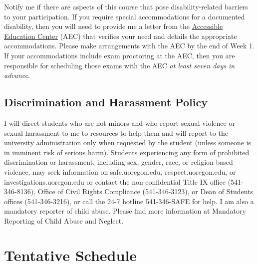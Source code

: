 \documentclass[11pt]{article}
\begin{document}
Notify me if there are aspects of this course that pose disability-related barriers to your participation. If you require special accommodations for a documented disability, then you will need to provide me a letter from the \href{https://aec.uoregon.edu/}{Accessible Education Center} (AEC) that verifies your need and details the appropriate accommodations. Please make arrangements with the AEC by the end of Week 1. If your accommodations include exam proctoring at the AEC, then you are responsible for scheduling those exams with the AEC \textit{at least seven days in advance}.

\subsection*{Discrimination and Harassment Policy} 

I will direct students who are not minors and who report sexual violence or sexual harassment to me to resources to help them and will report to the university administration only when requested by the student (unless someone is in imminent risk of serious harm). Students experiencing any form of prohibited discrimination or harassment, including sex, gender, race, or religion based violence, may seek information on safe.uoregon.edu, respect.uoregon.edu, or investigations.uoregon.edu or contact the non-confidential Title IX office (541-346-8136), Office of Civil Rights Compliance (541-346-3123), or Dean of Students offices (541-346-3216), or call the 24-7 hotline 541-346-SAFE for help. I am also a mandatory reporter of child abuse. Please find more information at Mandatory Reporting of Child Abuse and Neglect.
\newpage
\section*{Tentative Schedule}
\end{document}
